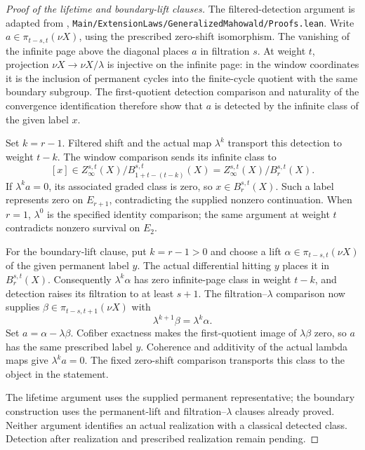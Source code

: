 \begin{proof}[Proof of the lifetime and boundary-lift clauses]
The filtered-detection argument is adapted from
\cite{KIPMainSourcec60fbbbb93ee},
\texttt{Main/ExtensionLaws/GeneralizedMahowald/Proofs.lean}.
Write $a\in\pi_{t-s,t}(\nu X)$, using the prescribed zero-shift
isomorphism. The vanishing of the infinite page above the diagonal
places $a$ in filtration $s$. At weight $t$, projection
$\nu X\to\nu X/\lambda$ is injective on the infinite page: in the
window coordinates it is the inclusion of permanent cycles into the
finite-cycle quotient with the same boundary subgroup. The
first-quotient detection comparison and naturality of the convergence
identification therefore show that $a$ is detected by the infinite
class of the given label $x$.

Set $k=r-1$. Filtered shift and the actual map $\lambda^k$ transport
this detection to weight $t-k$. The window comparison sends its
infinite class to
\[
[x]\in Z_\infty^{s,t}(X)/B_{1+t-(t-k)}^{s,t}(X)
     =Z_\infty^{s,t}(X)/B_r^{s,t}(X).
\]
If $\lambda^k a=0$, its associated graded class is zero, so
$x\in B_r^{s,t}(X)$. Such a label represents zero on $E_{r+1}$,
contradicting the supplied nonzero continuation. When $r=1$,
$\lambda^0$ is the specified identity comparison; the same argument
at weight $t$ contradicts nonzero survival on $E_2$.

For the boundary-lift clause, put $k=r-1>0$ and choose a lift
$\alpha\in\pi_{t-s,t}(\nu X)$ of the given permanent label $y$.
The actual differential hitting $y$ places it in $B_r^{s,t}(X)$.
Consequently $\lambda^k\alpha$ has zero infinite-page class in
weight $t-k$, and detection raises its filtration to at least $s+1$.
The filtration--$\lambda$ comparison now supplies
$\beta\in\pi_{t-s,t+1}(\nu X)$ with
\[
\lambda^{k+1}\beta=\lambda^k\alpha.
\]
Set $a=\alpha-\lambda\beta$. Cofiber exactness makes the
first-quotient image of $\lambda\beta$ zero, so $a$ has the same
prescribed label $y$. Coherence and additivity of the actual lambda
maps give $\lambda^k a=0$. The fixed zero-shift comparison transports
this class to the object in the statement.

The lifetime argument uses the supplied permanent representative;
the boundary construction uses the permanent-lift and
filtration--$\lambda$ clauses already proved. Neither argument
identifies an actual realization with a classical detected class.
Detection after realization and prescribed realization remain pending.
\end{proof}


